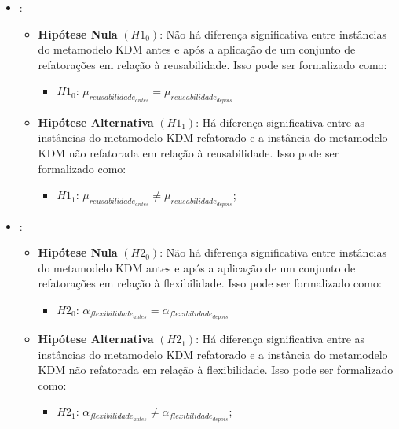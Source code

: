 \begin{itemize}

\item {}:

\begin{itemize}
\item \textbf{Hipótese Nula} \textbf{$(H1_{0})$}: Não há diferença significativa entre instâncias do metamodelo KDM antes e após a aplicação de um conjunto de refatorações em relação à reusabilidade. Isso pode ser formalizado como: 

\begin{itemize}
\item $H1_{0}$: $\mu_{reusabilidade_{antes}} = \mu_{reusabilidade_{depois}}$
\end{itemize}

\item \textbf{Hipótese Alternativa} \textbf{$(H1_{1})$}: Há diferença significativa entre as instâncias do metamodelo KDM refatorado e a instância do metamodelo KDM não refatorada em relação à reusabilidade. Isso pode ser formalizado como: 

\begin{itemize}
\item $H1_{1}$: $\mu_{reusabilidade_{antes}} \neq \mu_{reusabilidade_{depois}}$;
\end{itemize}
\end{itemize}

\item {}:

\begin{itemize}
\item \textbf{Hipótese Nula} \textbf{$(H2_{0})$}: Não há diferença significativa entre instâncias do metamodelo KDM antes e após a aplicação de um conjunto de refatorações em relação à flexibilidade. Isso pode ser formalizado como: 

\begin{itemize}
\item $H2_{0}$: $\alpha_{flexibilidade_{antes}} = \alpha_{flexibilidade_{depois}}$
\end{itemize}

\item \textbf{Hipótese Alternativa} \textbf{$(H2_{1})$}: Há diferença significativa entre as instâncias do metamodelo KDM refatorado e a instância do metamodelo KDM não refatorada em relação à flexibilidade. Isso pode ser formalizado como: 

\begin{itemize}
\item $H2_{1}$: $\alpha_{flexibilidade_{antes}} \neq \alpha_{flexibilidade_{depois}}$;
\end{itemize}
\end{itemize}


\end{itemize}
